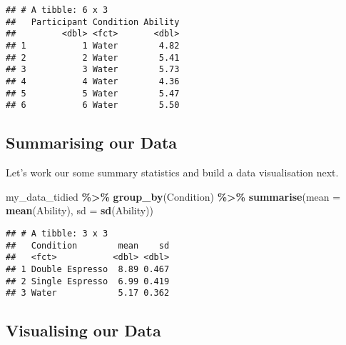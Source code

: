 \documentclass[
]{book}
\newenvironment{Shaded}{\begin{snugshade}}{\end{snugshade}}
\newcommand{\AttributeTok}[1]{\textcolor[rgb]{0.13,0.29,0.53}{#1}}
\newcommand{\FunctionTok}[1]{\textcolor[rgb]{0.13,0.29,0.53}{\textbf{#1}}}
\newcommand{\NormalTok}[1]{#1}
\newcommand{\SpecialCharTok}[1]{\textcolor[rgb]{0.81,0.36,0.00}{\textbf{#1}}}
\begin{document}
\begin{verbatim}
## # A tibble: 6 x 3
##   Participant Condition Ability
##         <dbl> <fct>       <dbl>
## 1           1 Water        4.82
## 2           2 Water        5.41
## 3           3 Water        5.73
## 4           4 Water        4.36
## 5           5 Water        5.47
## 6           6 Water        5.50
\end{verbatim}

\hypertarget{summarising-our-data}{%
\subsection{Summarising our Data}\label{summarising-our-data}}

Let's work our some summary statistics and build a data visualisation next.

\begin{Shaded}
\begin{Highlighting}[]
\NormalTok{my\_data\_tidied }\SpecialCharTok{\%\textgreater{}\%}
  \FunctionTok{group\_by}\NormalTok{(Condition) }\SpecialCharTok{\%\textgreater{}\%}
  \FunctionTok{summarise}\NormalTok{(}\AttributeTok{mean =} \FunctionTok{mean}\NormalTok{(Ability), }\AttributeTok{sd =} \FunctionTok{sd}\NormalTok{(Ability))}
\end{Highlighting}
\end{Shaded}

\begin{verbatim}
## # A tibble: 3 x 3
##   Condition        mean    sd
##   <fct>           <dbl> <dbl>
## 1 Double Espresso  8.89 0.467
## 2 Single Espresso  6.99 0.419
## 3 Water            5.17 0.362
\end{verbatim}

\hypertarget{visualising-our-data}{%
\subsection{Visualising our Data}\label{visualising-our-data}}
\end{document}
